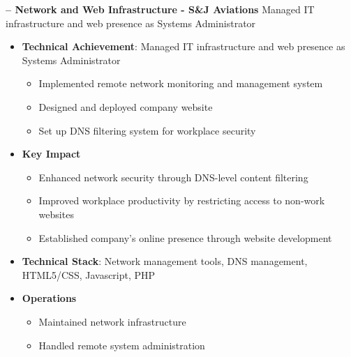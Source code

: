 \begin{sectionContainer}
	\vspace{0.4em}\noindent\large\textbf{– Network and Web Infrastructure - S\&J Aviations}
	\vspace{0.8em} \newline
	\noindent Managed IT infrastructure and web presence as Systems Administrator
	\begin{itemize}[leftmargin=*, nosep, itemsep=0.4em, before=\vspace{0.6em}, after=\vspace{0.8em}, label={}]
		\item \textbf{Technical Achievement}: Managed IT infrastructure and web presence as Systems Administrator
		\begin{itemize}
			\item Implemented remote network monitoring and management system
			\item Designed and deployed company website
			\item Set up DNS filtering system for workplace security
		\end{itemize}
		\item \textbf{Key Impact}
		\begin{itemize}
			\item Enhanced network security through DNS-level content filtering
			\item Improved workplace productivity by restricting access to non-work websites
			\item Established company's online presence through website development
		\end{itemize}
		\item \textbf{Technical Stack}: Network management tools, DNS management, HTML5/CSS, Javascript, PHP
		\item \textbf{Operations}
		\begin{itemize}
			\item Maintained network infrastructure
			\item Handled remote system administration
		\end{itemize}
	\end{itemize}
\end{sectionContainer}

\texthr{}

